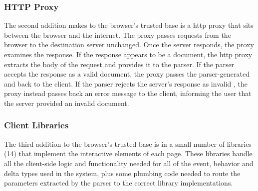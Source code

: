 \subsubsection{HTTP Proxy}
\label{future-web:implementation:proxy}
The second addition \CDF makes to the browser's trusted base is a \gls{http}
proxy that sits between the browser and the internet.  The proxy passes
requests from the browser to the destination server unchanged.  Once the server
responds, the proxy examines the response.  If the response appears to be a
\CDF document, the \gls{http} proxy extracts the body of the request and provides it
to the parser.  If the parser accepts the response as a valid \CDF document,
the proxy passes the parser-generated \HTML and \JS back to the client.  If the
parser rejects the server's response as invalid \CDF, the proxy instead passes
back an error message to the client, informing the user that the server
provided an invalid document.


\subsubsection{Client \JS Libraries}
\label{future-web:implementation:client-js}
The third addition to the browser's trusted base is in a small number of \JS
libraries (14) that implement the interactive elements of each page.  These
libraries handle all the client-side logic and functionality needed for all of
the event, behavior and delta types used in the system, plus some plumbing code
needed to route the parameters extracted by the parser to the correct library
implementations.
